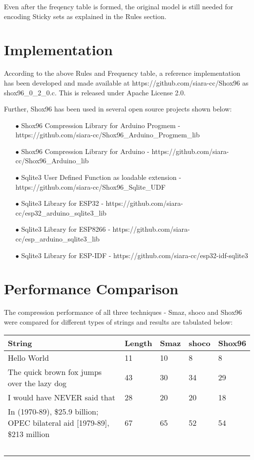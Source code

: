 \documentclass[]{article}
\begin{document}
Even after the freqency table is formed, the original model is still needed for encoding Sticky sets as explained in the Rules section.

\section{Implementation}

According to the above Rules and Frequency table, a reference implementation has been developed and made available at https://github.com/siara-cc/Shox96 as shox96\_0\_2\_0.c.  This is released under Apache License 2.0.

Further, Shox96 has been used in several open source projects shown below:

\begin{itemize}
	\item[$\bullet$] Shox96 Compression Library for Arduino Progmem - https://github.com/siara-cc/Shox96\_Arduino\_Progmem\_lib
	\item[$\bullet$] Shox96 Compression Library for Arduino - https://github.com/siara-cc/Shox96\_Arduino\_lib
	\item[$\bullet$] Sqlite3 User Defined Function as loadable extension - https://github.com/siara-cc/Shox96\_Sqlite\_UDF
	\item[$\bullet$] Sqlite3 Library for ESP32 - https://github.com/siara-cc/esp32\_arduino\_sqlite3\_lib
	\item[$\bullet$] Sqlite3 Library for ESP8266 - https://github.com/siara-cc/esp\_arduino\_sqlite3\_lib
	\item[$\bullet$] Sqlite3 Library for ESP-IDF - https://github.com/siara-cc/esp32-idf-sqlite3
\end{itemize}

\section{Performance Comparison}

The compression performance of all three techniques - Smaz, shoco and Shox96 were compared for different types of strings and results are tabulated below:

\begin{center}
\begin{tabular}{ | p{} | p{} | p{} | p{} | p{} |} \hline
﻿\textbf{String} & ﻿\textbf{Length} & ﻿\textbf{Smaz} & ﻿\textbf{shoco} & ﻿\textbf{Shox96} \\ \hline
Hello World & 11 & 10 & 8 & 8 \\ \hline
The quick brown fox jumps over the lazy dog & 43 & 30 & 34 & 29 \\ \hline
I would have NEVER said that & 28 & 20 & 20 & 18 \\ \hline
In (1970-89), \$25.9 billion; OPEC bilateral aid [1979-89], \$213 million & 67 & 65 & 52 & 54 \\ \hline
	﻿\end{tabular}
\end{center}
\end{document}
